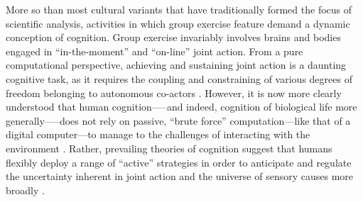 \begin{CJK}{UTF8}{gbsn}

More so than most cultural variants that have traditionally formed the focus of scientific analysis, activities in which group exercise feature demand a dynamic conception of cognition.  Group exercise invariably involves brains and bodies engaged in ``in-the-moment'' and ``on-line'' joint action.  From a pure computational perspective, achieving and sustaining joint action is a daunting cognitive task, as it requires the coupling and constraining of various degrees of freedom belonging to autonomous co-actors \citep{Bernstein1967,Turvey1978}.  However, it is now more clearly understood that human cognition—--and indeed, cognition of biological life more generally—--does not rely on passive, ``brute force'' computation---like that of a digital computer---to manage to the challenges of interacting with the environment \citep{Yufik2013}.  Rather, prevailing theories of cognition suggest that humans flexibly deploy a range of ``active'' strategies in order to anticipate and regulate the uncertainty inherent in joint action and the universe of sensory causes more broadly \citep{Clark2015}.


\end{CJK}
